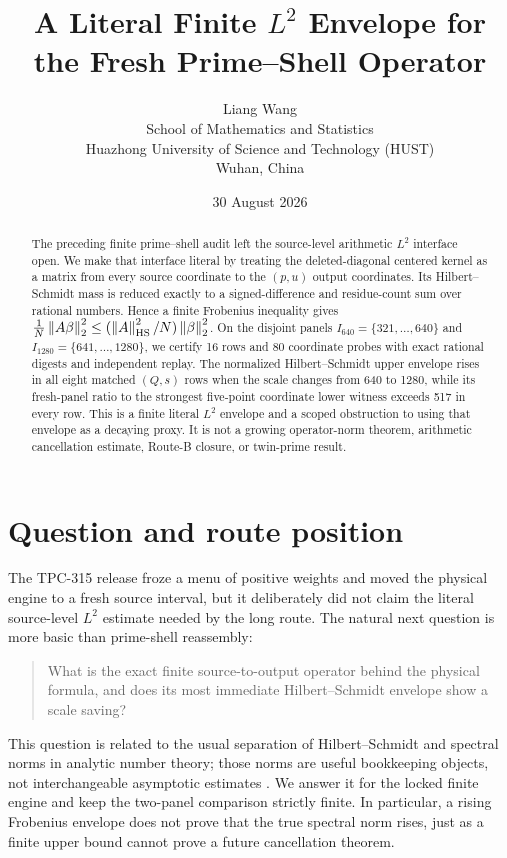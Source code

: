 \documentclass[10pt,a4paper]{article}
\title{A Literal Finite $L^2$ Envelope for the Fresh Prime--Shell Operator}
\author{Liang Wang\\
School of Mathematics and Statistics\\
Huazhong University of Science and Technology (HUST)\\
Wuhan, China}
\date{30 August 2026}
\newcommand{\norm}[1]{\left\lVert #1\right\rVert}
\begin{document}
\maketitle

\begin{abstract}
The preceding finite prime--shell audit left the source-level arithmetic
$L^2$ interface open.  We make that interface literal by treating the
deleted-diagonal centered kernel as a matrix from every source coordinate to
the $(p,u)$ output coordinates.  Its Hilbert--Schmidt mass is reduced exactly
to a signed-difference and residue-count sum over rational numbers.  Hence a
finite Frobenius inequality gives
\(\frac1N\norm{A\beta}_2^2\leq
(\norm{A}_{\rm HS}^2/N)\norm{\beta}_2^2\).
On the disjoint panels $I_{640}=\{321,\ldots,640\}$ and
$I_{1280}=\{641,\ldots,1280\}$, we certify 16 rows and 80 coordinate
probes with exact rational digests and independent replay.  The normalized
Hilbert--Schmidt upper envelope rises in all eight matched $(Q,s)$ rows when
the scale changes from 640 to 1280, while its fresh-panel ratio to the
strongest five-point coordinate lower witness exceeds 517 in every row.  This
is a finite literal $L^2$ envelope and a scoped obstruction to using that
envelope as a decaying proxy.  It is not a growing operator-norm theorem,
arithmetic cancellation estimate, Route-B closure, or twin-prime result.
\end{abstract}

\section{Question and route position}

The TPC-315 release froze a menu of positive weights and moved the physical
engine to a fresh source interval, but it deliberately did not claim the
literal source-level $L^2$ estimate needed by the long route.  The natural
next question is more basic than prime-shell reassembly:

\begin{quote}
What is the exact finite source-to-output operator behind the physical formula,
and does its most immediate Hilbert--Schmidt envelope show a scale saving?
\end{quote}

This question is related to the usual separation of Hilbert--Schmidt and
spectral norms in analytic number theory; those norms are useful bookkeeping
objects, not interchangeable asymptotic estimates \cite{montgomeryvaughan,iwankow}.
We answer it for the locked finite engine and keep the two-panel comparison
strictly finite.  In particular, a rising Frobenius envelope does not prove
that the true spectral norm rises, just as a finite upper bound cannot prove a
future cancellation theorem.
\end{document}
